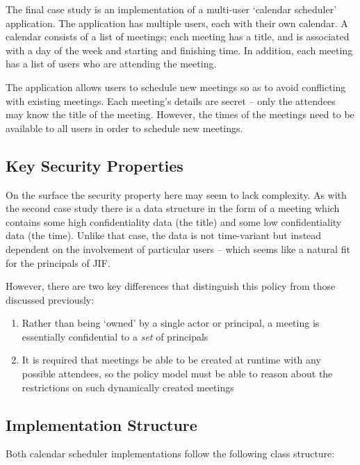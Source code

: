 The final case study is an implementation of a multi-user `calendar scheduler' application. The application has multiple users, each with their own calendar. A calendar consists of a list of meetings; each meeting has a title, and is associated with a day of the week and starting and finishing time. In addition, each meeting has a list of users who are attending the meeting.

The application allows users to schedule new meetings so as to avoid conflicting with existing meetings. Each meeting's details are secret -- only the attendees may know the title of the meeting. However, the times of the meetings need to be available to all users in order to schedule new meetings.

\subsection{Key Security Properties}

On the surface the security property here may seem to lack complexity. As with the second case study there is a data structure in the form of a meeting which contains some high confidentiality data (the title) and some low confidentiality data (the time). Unlike that case, the data is not time-variant but instead dependent on the involvement of particular users -- which seems like a natural fit for the principals of JIF.

However, there are two key differences that distinguish this policy from those discussed previously:

\begin{enumerate}
	
	\item Rather than being `owned' by a single actor or principal, a meeting is essentially confidential to a \textit{set} of principals
	
	\item It is required that meetings be able to be created at runtime with any possible attendees, so the policy model must be able to reason about the restrictions on such dynamically created meetings
	
\end{enumerate}

\subsection{Implementation Structure}

Both calendar scheduler implementations follow the following class structure:

